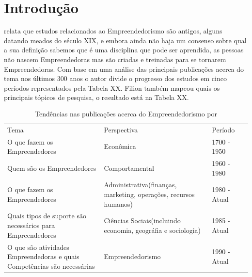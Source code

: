 \chapter{Introdução}
\label{cap-introducao}

 relata que estudos relacionados ao Empreendedorismo são antigos, alguns datando meados do século XIX, e embora ainda não haja um consenso sobre qual a sua definição sabemos que é uma disciplina que pode ser aprendida, as pessoas não nascem Empreendedoras mas são criadas e treinadas para se tornarem Empreendedoras. Com base em uma análise das principais publicações acerca do tema nos últimos 300 anos o autor divide o progresso dos estudos em cinco períodos representados pela Tabela XX. Filion também mapeou quais os principais tópicos de pesquisa, o resultado está na Tabela XX.

\begin{table}[!htb]
\centering
\caption{Tendências nas publicações acerca do Empreendedorismo por \cite{Filion1998}}
\label{tabela:tendencias_nas_publicacoes_acerca_do_empreendedorismo}
\begin{tabular}{llll}
Tema & Perspectiva & Período \\
O que fazem os Empreendedores & Econômica & 1700 - 1950 \\
Quem são os Empreendedores & Comportamental & 1960 - 1980 \\
O que fazem os Empreendedores & Administrativa(finanças, marketing, operações, recursos humanos) & 1980 - Atual \\
Quais tipos de suporte são necessários para Empreendedores & Ciências Sociais(incluindo economia, geográfia e sociologia) & 1985 - Atual \\
O que são atividades Empreendedoras e quais Competências são necessárias & Empreendedorismo & 1990 - Atual \\
\end{tabular}
\end{table}

